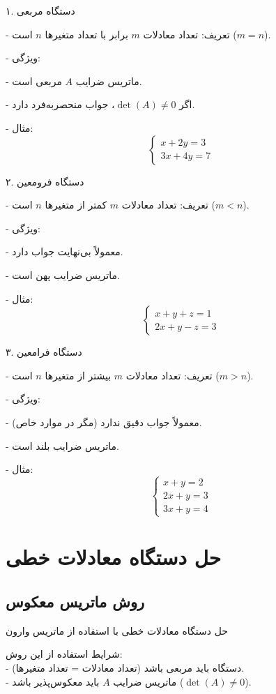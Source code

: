 \begin{definition}
	
۱. دستگاه مربعی 

- تعریف: تعداد معادلات \( m \) برابر با تعداد متغیرها \( n \) است (\( m = n \)).

- ویژگی:

- ماتریس ضرایب \( A \) مربعی است.

- اگر \( \det(A) \neq 0 \)، جواب منحصربه‌فرد دارد.

- مثال:
\[
\begin{cases}
	x + 2y = 3 \\
	3x + 4y = 7
\end{cases}
\]

۲. دستگاه فرومعین
 
- تعریف: تعداد معادلات \( m \) کمتر از متغیرها \( n \) است (\( m < n \)).

- ویژگی:

- معمولاً بی‌نهایت جواب دارد.

- ماتریس ضرایب پهن است.

- مثال:
\[
\begin{cases}
	x + y + z = 1 \\
	2x + y - z = 3
\end{cases}
\]

۳. دستگاه فرامعین 

- تعریف: تعداد معادلات \( m \) بیشتر از متغیرها \( n \) است (\( m > n \)).

- ویژگی:

- معمولاً جواب دقیق ندارد (مگر در موارد خاص).

- ماتریس ضرایب بلند است.

- مثال:
\[
\begin{cases}
	x + y = 2 \\
	2x + y = 3 \\
	3x + y = 4
\end{cases}
\]	
\end{definition}
\section{حل دستگاه معادلات خطی}
\subsection{روش ماتریس معکوس}

 حل دستگاه معادلات خطی با استفاده از ماتریس وارون

شرایط استفاده از این روش:\\
- دستگاه باید مربعی باشد (تعداد معادلات = تعداد متغیرها).\\
- ماتریس ضرایب \( A \) باید معکوس‌پذیر باشد (\(\det(A) \neq 0\)).\\


